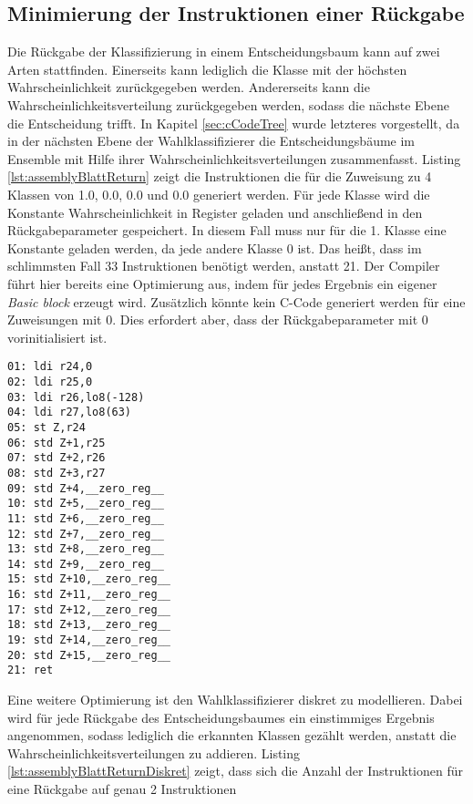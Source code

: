 \subsection{Minimierung der Instruktionen einer Rückgabe}
Die Rückgabe der Klassifizierung in einem Entscheidungsbaum kann auf zwei Arten stattfinden. Einerseits kann lediglich die Klasse mit der höchsten Wahrscheinlichkeit zurückgegeben werden. Andererseits kann die
Wahrscheinlichkeitsverteilung zurückgegeben werden, sodass die nächste Ebene die Entscheidung trifft. In Kapitel \ref{sec:cCodeTree} wurde letzteres vorgestellt, da in der nächsten Ebene der Wahlklassifizierer
die Entscheidungsbäume im Ensemble mit Hilfe ihrer Wahrscheinlichkeitsverteilungen zusammenfasst.
\newline
\newline
Listing \ref{lst:assemblyBlattReturn} zeigt die Instruktionen die für die Zuweisung zu 4 Klassen von 1.0, 0.0, 0.0 und 0.0 generiert werden. Für jede Klasse wird die Konstante Wahrscheinlichkeit in Register geladen
und anschließend in den Rückgabeparameter gespeichert. In diesem Fall muss nur für die 1. Klasse eine Konstante geladen werden, da jede andere Klasse 0 ist. Das heißt, dass im schlimmsten Fall 33
Instruktionen benötigt werden, anstatt 21. Der Compiler führt hier bereits eine Optimierung aus, indem für jedes Ergebnis ein eigener \textit{Basic block} erzeugt wird. Zusätzlich könnte kein C-Code generiert werden
für eine Zuweisungen mit 0. Dies erfordert aber, dass der Rückgabeparameter mit 0 vorinitialisiert ist.
\begin{lstlisting}[label=lst:assemblyBlattReturn,caption={Beispiel der Instruktionen einer Rückgabe der Wahrscheinlichkeitsverteilung eines Entscheidungsbaumes mit 4 Klassen.}]
01: ldi r24,0
02: ldi r25,0
03: ldi r26,lo8(-128)
04: ldi r27,lo8(63)
05: st Z,r24
06: std Z+1,r25
07: std Z+2,r26
08: std Z+3,r27
09: std Z+4,__zero_reg__
10: std Z+5,__zero_reg__
11: std Z+6,__zero_reg__
12: std Z+7,__zero_reg__
13: std Z+8,__zero_reg__
14: std Z+9,__zero_reg__
15: std Z+10,__zero_reg__
16: std Z+11,__zero_reg__
17: std Z+12,__zero_reg__
18: std Z+13,__zero_reg__
19: std Z+14,__zero_reg__
20: std Z+15,__zero_reg__
21: ret
\end{lstlisting}
Eine weitere Optimierung ist den Wahlklassifizierer diskret zu modellieren. Dabei wird für jede Rückgabe des Entscheidungsbaumes ein einstimmiges Ergebnis angenommen, sodass lediglich die erkannten Klassen
gezählt werden, anstatt die Wahrscheinlichkeitsverteilungen zu addieren. Listing \ref{lst:assemblyBlattReturnDiskret} zeigt, dass sich die Anzahl der Instruktionen für eine Rückgabe auf genau 2 Instruktionen
